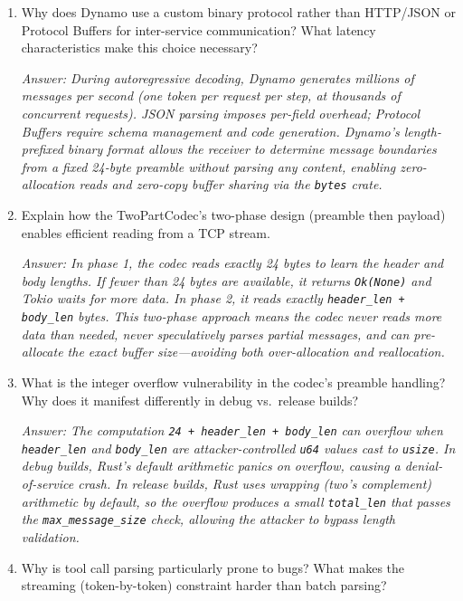 \begin{enumerate}
  \item Why does Dynamo use a custom binary protocol rather than HTTP/JSON or Protocol Buffers for inter-service communication? What latency characteristics make this choice necessary?

  \emph{Answer: During autoregressive decoding, Dynamo generates millions of messages per second (one token per request per step, at thousands of concurrent requests). JSON parsing imposes per-field overhead; Protocol Buffers require schema management and code generation. Dynamo's length-prefixed binary format allows the receiver to determine message boundaries from a fixed 24-byte preamble without parsing any content, enabling zero-allocation reads and zero-copy buffer sharing via the \texttt{bytes} crate.}

  \item Explain how the TwoPartCodec's two-phase design (preamble then payload) enables efficient reading from a TCP stream.

  \emph{Answer: In phase 1, the codec reads exactly 24 bytes to learn the header and body lengths. If fewer than 24 bytes are available, it returns \texttt{Ok(None)} and Tokio waits for more data. In phase 2, it reads exactly \texttt{header\_len + body\_len} bytes. This two-phase approach means the codec never reads more data than needed, never speculatively parses partial messages, and can pre-allocate the exact buffer size---avoiding both over-allocation and reallocation.}

  \item What is the integer overflow vulnerability in the codec's preamble handling? Why does it manifest differently in debug vs.\ release builds?

  \emph{Answer: The computation \texttt{24 + header\_len + body\_len} can overflow when \texttt{header\_len} and \texttt{body\_len} are attacker-controlled \texttt{u64} values cast to \texttt{usize}. In debug builds, Rust's default arithmetic panics on overflow, causing a denial-of-service crash. In release builds, Rust uses wrapping (two's complement) arithmetic by default, so the overflow produces a small \texttt{total\_len} that passes the \texttt{max\_message\_size} check, allowing the attacker to bypass length validation.}

  \item Why is tool call parsing particularly prone to bugs? What makes the streaming (token-by-token) constraint harder than batch parsing?


\end{enumerate}

